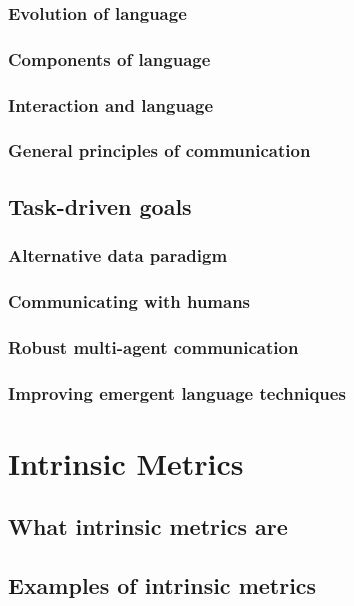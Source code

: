 \subsection{Evolution of language}
\subsection{Components of language}
\subsection{Interaction and language}
\subsection{General principles of communication}
\section{Task-driven goals}
\subsection{Alternative data paradigm}
\subsection{Communicating with humans}
\subsection{Robust multi-agent communication}
\subsection{Improving emergent language techniques}


\chapter{Intrinsic Metrics}
\section{What intrinsic metrics are}
\section{Examples of intrinsic metrics}
